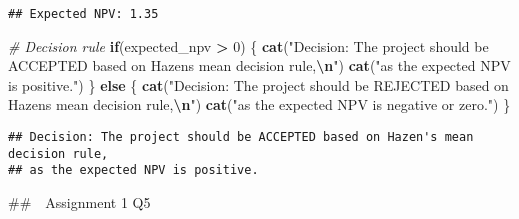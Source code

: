 \documentclass[
]{article}
\newenvironment{Shaded}{\begin{snugshade}}{\end{snugshade}}
\newcommand{\CommentTok}[1]{\textcolor[rgb]{0.56,0.35,0.01}{\textit{#1}}}
\newcommand{\ControlFlowTok}[1]{\textcolor[rgb]{0.13,0.29,0.53}{\textbf{#1}}}
\newcommand{\DecValTok}[1]{\textcolor[rgb]{0.00,0.00,0.81}{#1}}
\newcommand{\FunctionTok}[1]{\textcolor[rgb]{0.13,0.29,0.53}{\textbf{#1}}}
\newcommand{\NormalTok}[1]{#1}
\newcommand{\SpecialCharTok}[1]{\textcolor[rgb]{0.81,0.36,0.00}{\textbf{#1}}}
\newcommand{\StringTok}[1]{\textcolor[rgb]{0.31,0.60,0.02}{#1}}
\begin{document}
\begin{verbatim}
## Expected NPV: 1.35
\end{verbatim}

\begin{Shaded}
\begin{Highlighting}[]
\CommentTok{\# Decision rule}
\ControlFlowTok{if}\NormalTok{(expected\_npv }\SpecialCharTok{\textgreater{}} \DecValTok{0}\NormalTok{) \{}
  \FunctionTok{cat}\NormalTok{(}\StringTok{"Decision: The project should be ACCEPTED based on Hazen\textquotesingle{}s mean decision rule,}\SpecialCharTok{\textbackslash{}n}\StringTok{"}\NormalTok{)}
  \FunctionTok{cat}\NormalTok{(}\StringTok{"as the expected NPV is positive."}\NormalTok{)}
\NormalTok{\} }\ControlFlowTok{else}\NormalTok{ \{}
  \FunctionTok{cat}\NormalTok{(}\StringTok{"Decision: The project should be REJECTED based on Hazen\textquotesingle{}s mean decision rule,}\SpecialCharTok{\textbackslash{}n}\StringTok{"}\NormalTok{)}
  \FunctionTok{cat}\NormalTok{(}\StringTok{"as the expected NPV is negative or zero."}\NormalTok{)}
\NormalTok{\}}
\end{Highlighting}
\end{Shaded}

\begin{verbatim}
## Decision: The project should be ACCEPTED based on Hazen's mean decision rule,
## as the expected NPV is positive.
\end{verbatim}

\#\#　Assignment 1 Q5
\end{document}
